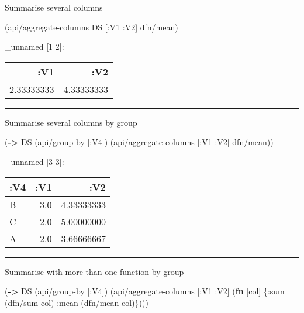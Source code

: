 \documentclass[]{article}
\newenvironment{Shaded}{\begin{snugshade}}{\end{snugshade}}
\newcommand{\KeywordTok}[1]{\textcolor[rgb]{0.13,0.29,0.53}{\textbf{#1}}}
\newcommand{\AttributeTok}[1]{\textcolor[rgb]{0.77,0.63,0.00}{#1}}
\newcommand{\NormalTok}[1]{#1}
\begin{document}
Summarise several columns

\begin{Shaded}
\begin{Highlighting}[]
\NormalTok{(api/aggregate-columns DS [}\AttributeTok{:V1} \AttributeTok{:V2}\NormalTok{] dfn/mean)}
\end{Highlighting}
\end{Shaded}

\_unnamed {[}1 2{]}:

\begin{longtable}[]{@{}rr@{}}
\toprule
:V1 & :V2\tabularnewline
\midrule
\endhead
2.33333333 & 4.33333333\tabularnewline
\bottomrule
\end{longtable}

\begin{center}\rule{0.5\linewidth}{0.5pt}\end{center}

Summarise several columns by group

\begin{Shaded}
\begin{Highlighting}[]
\NormalTok{(}\KeywordTok{->}\NormalTok{ DS}
\NormalTok{    (api/group-by [}\AttributeTok{:V4}\NormalTok{])}
\NormalTok{    (api/aggregate-columns [}\AttributeTok{:V1} \AttributeTok{:V2}\NormalTok{] dfn/mean))}
\end{Highlighting}
\end{Shaded}

\_unnamed {[}3 3{]}:

\begin{longtable}[]{@{}lrr@{}}
\toprule
:V4 & :V1 & :V2\tabularnewline
\midrule
\endhead
B & 3.0 & 4.33333333\tabularnewline
C & 2.0 & 5.00000000\tabularnewline
A & 2.0 & 3.66666667\tabularnewline
\bottomrule
\end{longtable}

\begin{center}\rule{0.5\linewidth}{0.5pt}\end{center}

Summarise with more than one function by group

\begin{Shaded}
\begin{Highlighting}[]
\NormalTok{(}\KeywordTok{->}\NormalTok{ DS}
\NormalTok{    (api/group-by [}\AttributeTok{:V4}\NormalTok{])}
\NormalTok{    (api/aggregate-columns [}\AttributeTok{:V1} \AttributeTok{:V2}\NormalTok{] (}\KeywordTok{fn}\NormalTok{ [col]}
\NormalTok{                                       \{}\AttributeTok{:sum}\NormalTok{ (dfn/sum col)}
                                        \AttributeTok{:mean}\NormalTok{ (dfn/mean col)\})))}
\end{Highlighting}
\end{Shaded}
\end{document}
